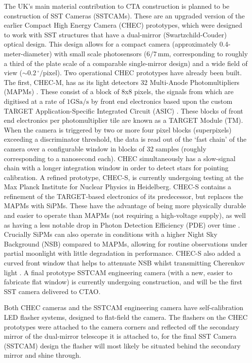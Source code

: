 The UK's main material contribution to CTA construction is planned to be construction of SST Cameras (SSTCAMs). These are an upgraded version of the earlier Compact High Energy Camera (CHEC) prototypes, which were designed to work with SST structures that have a dual-mirror (Swartzchild-Couder) optical design. This design allows for a compact camera (approximately 0.4-meter-diameter) with small scale photosensors ($\mathrm{6/7\,mm}$, corresponding to roughly a third of the plate scale of a comparable single-mirror design) and a wide field of view ($\mathrm{\sim0.2\,^{\circ}/pixel}$).  Two operational CHEC prototypes have already been built. The first, CHEC-M, has as its light detectors 32 Multi-Anode Photomultipliers (MAPMs) \cite{tomthesis}. These consist of a block of 8x8 pixels, the signals from which are digitised at a rate of $1\mathrm{GSa}/\mathrm{s}$ \cite{tomthesis} by front end electronics based upon the custom TARGET Application-Specific Integrated Circuit (ASIC) \cite{checmpaper}. These blocks of front end electronics per photomultiplier tile are known as a TARGET Module (TM). When the camera is triggered by two or more four pixel blocks (superpixels) exceeding a discriminator threshold, the data is read out of the `fast chain' of the camera over a configurable window in blocks of 32 samples (roughly corresponding to a nanosecond each). CHEC simultaneously has a slow-signal chain with a longer integration window in order to detect stars for pointing calibration. A refined prototype, CHEC-S, is currently undergoing testing at the Max Planck Institute for Nuclear Physics in Heidelberg. CHEC-S contains a refinement of the TARGET-based electronics of its predecessor, but replaces the MAPMs with SiPMs. These have the advantage of being more physically durable and easier to operate than MAPMs (not requiring a high-voltage supply), as well as having a less notable drop in Photon Detection Efficiency (PDE) over time \cite{factphotonstream}. Crucially SiPMs can also operate in conditions with a higher Night Sky Background (NSB) compared to MAPMs, allowing for routine observations under partial moonlight with little degradation in performance. CHEC-S also added a curved front window that helps to attenuate NSB whilst transmitting Cherenkov light \cite{ssticrc}. A final prototype SSTCAM engineering camera (with a new, easier to fabricate flat window) is currently undergoing construction, and will be the first SST camera delivered to CTAO.

Both CHEC cameras and the SSTCAM engineering camera have self-calibration LED flasher systems, designed to flat-field the camera. The flashers on the CHEC prototypes were attached to the camera corners and reflected off the secondary mirror of the dual-mirror telescope it is attached to, for the final SST Camera (SSTCAM) design the flasher will most likely be situated behind the secondary mirror and shine through.

